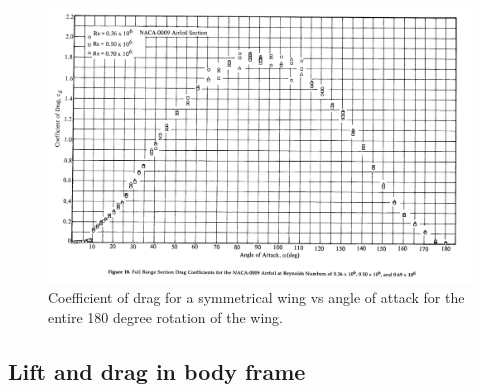 \begin{figure}[h]
    \center
    \includegraphics[scale=0.15]{drag180.png}
    \caption{Coefficient of drag for a symmetrical wing vs angle of attack for the entire 180 degree rotation of the wing.}
    \label{drag}
\end{figure}


\subsection{Lift and drag in body frame}

